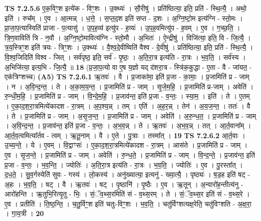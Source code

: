 \documentclass[17pt]{extarticle}
\begin{document}
                  \newline
                                \textbf{ TS 7.2.5.6} \newline
                  ए॒क॒विꣳ॒॒श इत्ये॑क - विꣳ॒॒शः । उ॒क्थ्यः॑ । सौ॒रीषु॑ । प्रति॑ष्ठित्या॒ इति॒ प्रति॑ - स्थि॒त्यै॒ । अथो॒ इति॑ । रुच᳚म् । ए॒व । आ॒त्मन्न् । ध॒त्ते॒ । स॒प्त॒द॒श इति॑ सप्त - द॒शः । अ॒ग्नि॒ष्टो॒म इत्य॑ग्नि - स्तो॒मः । प्रा॒जा॒प॒त्यास्विति॑ प्राजा - प॒त्यासु॑ । उ॒प॒ह॒व्य॑ इत्यु॑प - ह॒व्यः॑ । उ॒प॒ह॒वमित्यु॑प - ह॒वम् । ए॒व । ग॒च्छ॒ति॒ । त्रि॒ण॒वाविति॑ त्रि - न॒वौ । अ॒ग्नि॒ष्टो॒मावित्य॑ग्नि - स्तो॒मौ । अ॒भितः॑ । ऐ॒न्द्रीषु॑ । विजि॑त्या॒ इति॒ वि - जि॒त्यै॒ । त्र॒य॒स्त्रिꣳ॒॒श इति॑ त्रयः - त्रिꣳ॒॒शः । उ॒क्थ्यः॑ । वै॒श्व॒दे॒वीष्विति॑ वैश्व - दे॒वीषु॑ । प्रति॑ष्ठित्या॒ इति॒ प्रति॑ - स्थि॒त्यै॒ । वि॒श्व॒जिदिति॑ विश्व - जित् । सर्व॑पृष्ठ॒ इति॒ सर्व॑ - पृ॒ष्ठः॒ । अ॒ति॒रा॒त्र इत्य॑ति - रा॒त्रः । भ॒व॒ति॒ । सर्व॑स्य । अ॒भिजि॑त्या॒ इत्य॒भि - जि॒त्यै॒ ॥ \textbf{  18} \newline
                  \newline
                      (प्र॒जा॒प॒त्यो वा ए॒ष य॒ज्ञो यद् द॑शरा॒त्र - स्त्रि॑क॒कुद्धा - ए॒ता - वै - जा॑यत॒ - एक॑त्रिꣳशच्च)  \textbf{(A5)} \newline \newline
                                \textbf{ TS 7.2.6.1} \newline
                  ऋ॒तवः॑ । वै । प्र॒जाका॑मा॒ इति॑ प्र॒जा - का॒माः॒ । प्र॒जामिति॑ प्र - जाम् । न । अ॒वि॒न्द॒न्त॒ । ते । अ॒का॒म॒य॒न्त॒ । प्र॒जामिति॑ प्र - जाम् । सृ॒जे॒म॒हि॒ । प्र॒जामिति॑ प्र-जाम् । अवेति॑ । रु॒न्धी॒म॒हि॒ । प्र॒जामिति॑ प्र - जाम् । वि॒न्दे॒म॒हि॒ । प्र॒जाव॑न्त॒ इति॑ प्र॒जा - व॒न्तः॒ । स्या॒म॒ । इति॑ । ते । ए॒तम् । ए॒का॒द॒श॒रा॒त्रमित्ये॑कादश - रा॒त्रम् । अ॒प॒श्य॒न्न् । तम् । एति॑ । अ॒ह॒र॒न्न् । तेन॑ । अ॒य॒ज॒न्त॒ । ततः॑ । वै । ते । प्र॒जामिति॑ प्र - जाम् । अ॒सृ॒ज॒न्त॒ । प्र॒जामिति॑ प्र - जाम् । अवेति॑ । अ॒रु॒न्ध॒त॒ । प्र॒जामिति॑ प्र - जाम् । अ॒वि॒न्द॒न्त॒ । प्र॒जाव॑न्त॒ इति॑ प्र॒जा - व॒न्तः॒ । अ॒भ॒व॒न्न् । ते । ऋ॒तवः॑ । अ॒भ॒व॒न्न् । तत् । आ॒र्त॒वाना᳚म् । आ॒र्त॒व॒त्वमित्या᳚र्तव - त्वम् । ऋ॒तू॒नाम् । वै । ए॒ते । पु॒त्राः । तस्मा᳚त् । \textbf{  19} \newline
                  \newline
                                \textbf{ TS 7.2.6.2} \newline
                  आ॒र्त॒वाः । उ॒च्य॒न्ते॒ । ये । ए॒वम् । वि॒द्वाꣳसः॑ । ए॒का॒द॒श॒रा॒त्रमित्ये॑कादश - रा॒त्रम् । आस॑ते । प्र॒जामिति॑ प्र - जाम् । ए॒व । सृ॒ज॒न्ते॒ । प्र॒जामिति॑ प्र - जाम् । अवेति॑ । रु॒न्ध॒ते॒ । प्र॒जामिति॑ प्र - जाम् । वि॒न्द॒न्ते॒ । प्र॒जाव॑न्त॒ इति॑ प्र॒जा - व॒न्तः॒ । भ॒व॒न्ति॒ । ज्योतिः॑ । अ॒ति॒रा॒त्र इत्य॑ति - रा॒त्रः । भ॒व॒ति॒ । ज्योतिः॑ । ए॒व । पु॒रस्ता᳚त् । द॒ध॒ते॒ । सु॒व॒र्गस्येति॑ सुवः - गस्य॑ । लो॒कस्य॑ । अनु॑ख्यात्या॒ इत्यनु॑ - ख्या॒त्यै॒ । पृष्ठ्यः॑ । ष॒ड॒ह इति॑ षट् - अ॒हः । भ॒व॒ति॒ । षट् । वै । ऋ॒तवः॑ । षट् । पृ॒ष्ठानि॑ । पृ॒ष्ठैः । ए॒व । ऋ॒तून् । अ॒न्वारो॑ह॒न्तीत्य॑नु - आरो॑हन्ति । ऋ॒तुभि॒रित्यृ॒तु - भिः॒ । सं॒ॅव॒थ्स॒रमिति॑ सं - व॒थ्स॒रम् । ते । सं॒ॅव॒थ्स॒र इति॑ सं - व॒थ्स॒रे । ए॒व । प्रतीति॑ । ति॒ष्ठ॒न्ति॒ । च॒तु॒र्विꣳ॒॒श इति॑ चतुः-विꣳ॒॒शः । भ॒व॒ति॒ । चतु॑र्विꣳशत्यक्ष॒रेति॒ चतु॑विꣳशति - अ॒क्ष॒रा॒ । गा॒य॒त्री । \textbf{  20} \newline
\end{document}
